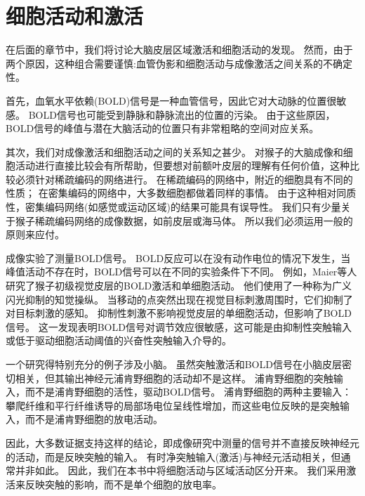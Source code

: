 \section{细胞活动和激活}
在后面的章节中，我们将讨论大脑皮层区域激活和细胞活动的发现。
然而，由于两个原因，这种组合需要谨慎:血管伪影和细胞活动与成像激活之间关系的不确定性。

\par
首先，血氧水平依赖(BOLD)信号是一种血管信号，因此它对大动脉的位置很敏感。
BOLD信号也可能受到静脉和静脉流出的位置的污染\cite{turner2002much}。
由于这些原因，BOLD信号的峰值与潜在大脑活动的位置只有非常粗略的空间对应关系\cite{kim2004spatial}。

\par
其次，我们对成像激活和细胞活动之间的关系知之甚少。
对猴子的大脑成像和细胞活动进行直接比较会有所帮助，但要想对前额叶皮层的理解有任何价值，这种比较必须针对稀疏编码的网络进行。
在稀疏编码的网络中，附近的细胞具有不同的性质；
在密集编码的网络中，大多数细胞都做着同样的事情。
由于这种相对同质性，密集编码网络(如感觉或运动区域)的结果可能具有误导性。
我们只有少量关于猴子稀疏编码网络的成像数据，如前皮层或海马体\cite{nakahara2002functional,orban2004comparative}。
所以我们必须运用一般的原则来应付。

\par
成像实验了测量BOLD信号。
BOLD反应可以在没有动作电位的情况下发生\cite{logothetis2002neural}，当峰值活动不存在时，BOLD信号可以在不同的实验条件下不同。
例如，Maier等人\cite{maier2008divergence}研究了猴子初级视觉皮层的BOLD激活和单细胞活动。
他们使用了一种称为广义闪光抑制的知觉操纵。
当移动的点突然出现在视觉目标刺激周围时，它们抑制了对目标刺激的感知。
抑制性刺激不影响视觉皮层的单细胞活动，但影响了BOLD信号。
这一发现表明BOLD信号对调节效应很敏感\cite{logothetis2008we}，这可能是由抑制性突触输入或低于驱动细胞活动阈值的兴奋性突触输入介导的。

\par
一个研究得特别充分的例子涉及小脑。
虽然突触激活和BOLD信号在小脑皮层密切相关，但其输出神经元浦肯野细胞的活动却不是这样\cite{thomsen2004principal}。
浦肯野细胞的突触输入，而不是浦肯野细胞的活性，驱动BOLD信号\cite{gold2002neuronal}。
浦肯野细胞的两种主要输入：攀爬纤维\cite{offenhauser2005activity}和平行纤维\cite{thomsen2009principal}诱导的局部场电位呈线性增加，而这些电位反映的是突触输入，而不是浦肯野细胞的放电活动。


\par
因此，大多数证据支持这样的结论，即成像研究中测量的信号并不直接反映神经元的活动，而是反映突触的输入。
有时净突触输入(激活)与神经元活动相关，但通常并非如此。
因此，我们在本书中将细胞活动与区域活动区分开来。
我们采用激活来反映突触的影响，而不是单个细胞的放电率\cite{logothetis2002neural}。


